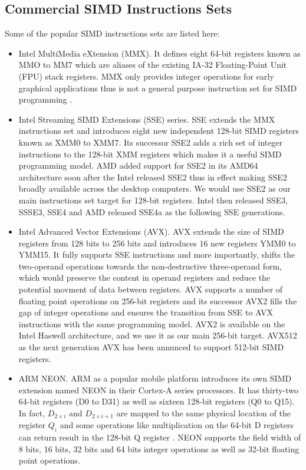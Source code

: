 \subsection{Commercial SIMD Instructions Sets}
Some of the popular SIMD instructions sets are listed here:
\begin{itemize}
  \item Intel MultiMedia eXtension (MMX). It defines eight 64-bit registers known as MMO to MM7 which are aliases of the existing IA-32 Floating-Point Unit (FPU) stack registers. MMX only provides integer operations for early graphical applications thus is not a general purpose instruction set for SIMD programming \cite{hua_idisa}.
  \item Intel Streaming SIMD Extensions (SSE) series. SSE extends the MMX instructions set and introduces eight new independent 128-bit SIMD registers known as XMM0 to XMM7. Its successor SSE2 adds a rich set of integer instructions to the 128-bit XMM registers which makes it a useful SIMD programming model. AMD added support for SSE2 in its AMD64 architecture soon after the Intel released SSE2 thus in effect making SSE2 broadly available across the desktop computers. We would use SSE2 as our main instructions set target for 128-bit registers. Intel then released SSE3, SSSE3, SSE4 and AMD released SSE4a as the following SSE generations.
  \item Intel Advanced Vector Extensions (AVX). AVX extends the size of SIMD registers from 128 bits to 256 bits and introduces 16 new registers YMM0 to YMM15. It fully supports SSE instructions and more importantly, shifts the two-operand operations towards the non-destructive three-operand form, which would preserve the content in operand registers and reduce the potential movment of data between registers. AVX supports a number of floating point operations on 256-bit registers and its successor AVX2 fills the gap of integer operations and ensures the transition from SSE to AVX instructions with the same programming model. AVX2 is available on the Intel Haswell architecture, and we use it as our main 256-bit target. AVX512 as the next generation AVX has been annunced to support 512-bit SIMD registers.
  \item ARM NEON\@. ARM as a popular mobile platform introduces its own SIMD extension named NEON in their Cortex-A series processors. It has thirty-two 64-bit registers (D0 to D31) as well as sixteen 128-bit registers (Q0 to Q15). In fact, $D_{2 \times i}$ and $D_{2 \times i + 1}$ are mapped to the same physical location of the register $Q_i$ and some operations like multiplication on the 64-bit D registers can return result in the 128-bit Q register \cite{hua_idisa}. NEON supports the field width of 8 bits, 16 bits, 32 bits and 64 bits integer operations as well as 32-bit floating point operations.
\end{itemize}

